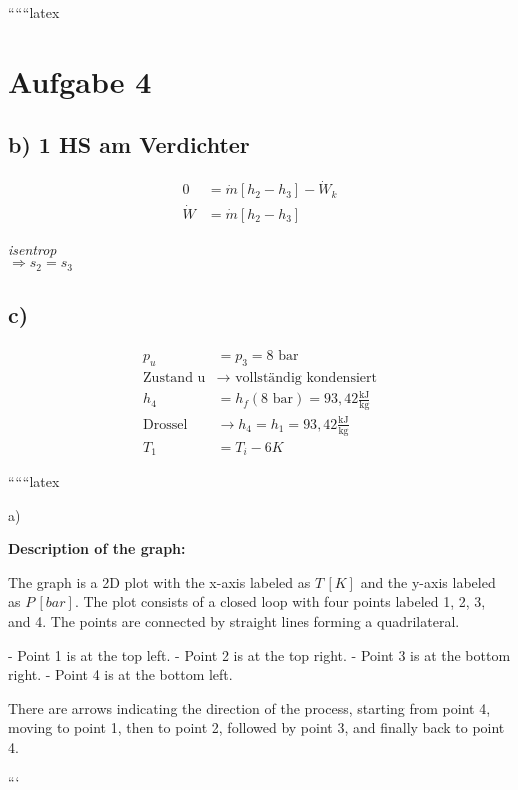 
``````latex

\section*{Aufgabe 4}

\subsection*{b) 1 HS am Verdichter}

\begin{align*}
0 &= \dot{m} \left[ h_2 - h_3 \right] - \dot{W}_k \\
\dot{W} &= \dot{m} \left[ h_2 - h_3 \right]
\end{align*}

\textit{isentrop} \\
\(\Rightarrow s_2 = s_3\)

\subsection*{c)}

\begin{align*}
p_u &= p_3 = 8 \text{ bar} \\
\text{Zustand u} &\rightarrow \text{ vollständig kondensiert} \\
h_4 &= h_f (8 \text{ bar}) = 93,42 \frac{\text{kJ}}{\text{kg}} \\
\text{Drossel} &\rightarrow h_4 = h_1 = 93,42 \frac{\text{kJ}}{\text{kg}} \\
T_1 &= T_i - 6K
\end{align*}

``````latex


a)

\textbf{Description of the graph:}

The graph is a 2D plot with the x-axis labeled as \( T \, [K] \) and the y-axis labeled as \( P \, [bar] \). The plot consists of a closed loop with four points labeled 1, 2, 3, and 4. The points are connected by straight lines forming a quadrilateral. 

- Point 1 is at the top left.
- Point 2 is at the top right.
- Point 3 is at the bottom right.
- Point 4 is at the bottom left.

There are arrows indicating the direction of the process, starting from point 4, moving to point 1, then to point 2, followed by point 3, and finally back to point 4.

```